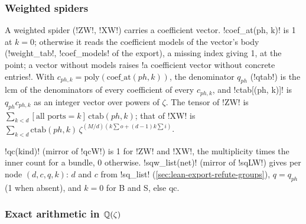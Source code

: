 {{{\subsubsection{Weighted spiders}\label{sec:lean-export-refute-weighted}

A weighted spider (\lexcode!ZW!, \lexcode!XW!) carries a coefficient vector. \lexpy!coef_at(ph, k)! is 1
at $k = 0$; otherwise it reads the coefficient models of the vector's body
(\lexpy!weight_tab!, \lexpy!coef_models! of the export), a missing index giving 1, at the point; a
vector without models raises \lexcode!a coefficient vector without concrete entries!. With
$c_{ph,k} = \mathrm{poly}(\mathrm{coef\_at}(ph,k))$, the denominator $q_{ph}$ (\lexpy!qtab!) is the
lcm of the denominators of every coefficient of every $c_{ph,k}$, and \lexpy!ctab[(ph, k)]! is
$q_{ph}c_{ph,k}$ as an integer vector over powers of $\zeta$. The tensor of \lexcode!ZW! is
$\sum_{k<d}[\text{all ports} = k]\,\mathrm{ctab}(ph,k)$; that of \lexcode!XW! is
$\sum_{k<d}\mathrm{ctab}(ph,k)\,\zeta^{(M/d)(k\sum o + (d-1)k\sum i)}$.

\lexpy!qc(kind)! (mirror of \lexlean!qcW!) is 1 for \lexcode!ZW! and \lexcode!XW!, the multiplicity times the
inner count for a bundle, 0 otherwise. \lexpy!sqw_list(net)! (mirror of \lexlean!sqLW!) gives per node
$(d, c, q, k)$: $d$ and $c$ from \lexpy!sq_list! (\cref{sec:lean-export-refute-groups}),
$q = q_{ph}$ (1 when absent), and $k = 0$ for B and S, else $\mathrm{qc}$.

\subsubsection{Exact arithmetic in \texorpdfstring{$\mathbb{Q}(\zeta)$}{Q(zeta)}}\label{sec:lean-export-refute-arith}

}}}
